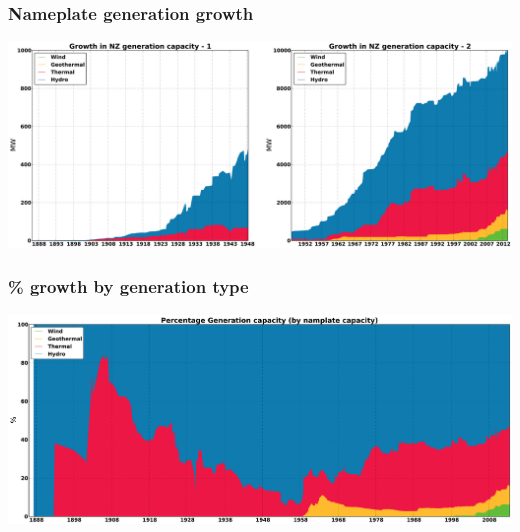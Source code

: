 \documentclass[aspectratio=169]{beamer}
\begin{document}



\frame
{\frametitle{Nameplate generation growth}
\begin{center}
\includegraphics[width=14cm]{./notebooks/125_years_of_data_files/125_years_of_data_fig_00.pdf} 
\end{center}
}




\frame
{\frametitle{\% growth by generation type}
\begin{center}
\includegraphics[width=14cm]{./notebooks/125_years_of_data_files/125_years_of_data_fig_02.pdf} 
\end{center}
}

\end{document}
